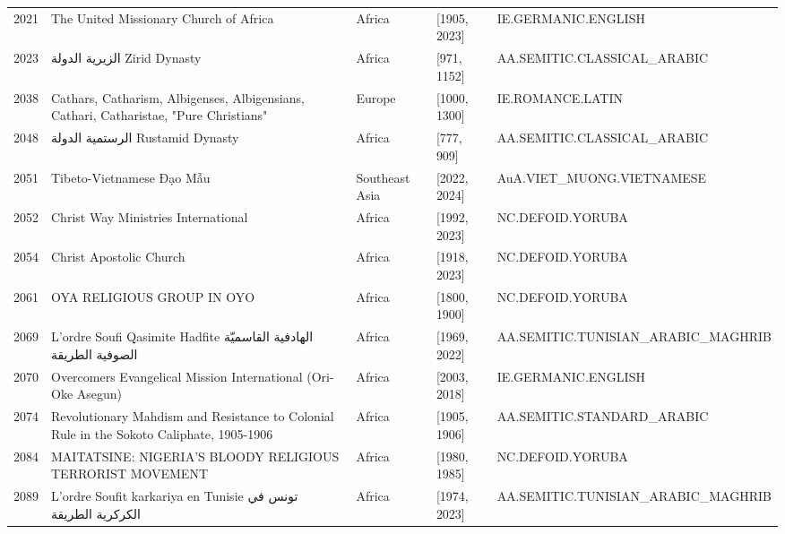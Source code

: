{\begin{longtable}{rp{3.5cm}llp{3.5cm}}
2021 & {\raggedright The United Missionary Church of Africa} & Africa & [1905, 2023] & {\raggedright IE.\allowbreak{}GERMANIC.\allowbreak{}ENGLISH} \\
2023 & {\raggedright {\arabicfont الزيرية الدولة} Zirid Dynasty} & Africa & [971, 1152] & {\raggedright AA.\allowbreak{}SEMITIC.\allowbreak{}CLASSICAL\_\allowbreak{}ARABIC} \\
2038 & {\raggedright Cathars, Catharism, Albigenses, Albigensians, Cathari, Catharistae, "Pure Christians"} & Europe & [1000, 1300] & {\raggedright IE.\allowbreak{}ROMANCE.\allowbreak{}LATIN} \\
2048 & {\raggedright {\arabicfont الرستمية الدولة} Rustamid Dynasty} & Africa & [777, 909] & {\raggedright AA.\allowbreak{}SEMITIC.\allowbreak{}CLASSICAL\_\allowbreak{}ARABIC} \\
2051 & {\raggedright Tibeto-Vietnamese Đạo Mẫu} & Southeast Asia & [2022, 2024] & {\raggedright AuA.\allowbreak{}VIET\_\allowbreak{}MUONG.\allowbreak{}VIETNAMESE} \\
2052 & {\raggedright Christ Way Ministries International} & Africa & [1992, 2023] & {\raggedright NC.\allowbreak{}DEFOID.\allowbreak{}YORUBA} \\
2054 & {\raggedright Christ Apostolic Church} & Africa & [1918, 2023] & {\raggedright NC.\allowbreak{}DEFOID.\allowbreak{}YORUBA} \\
2061 & {\raggedright OYA RELIGIOUS GROUP IN OYO} & Africa & [1800, 1900] & {\raggedright NC.\allowbreak{}DEFOID.\allowbreak{}YORUBA} \\
2069 & {\raggedright L'ordre Soufi Qasimite Hadfite {\arabicfont الهادفية القاسميّة الصوفية الطريقة}} & Africa & [1969, 2022] & {\raggedright AA.\allowbreak{}SEMITIC.\allowbreak{}TUNISIAN\_\allowbreak{}ARABIC\_\allowbreak{}MAGHRIB} \\
2070 & {\raggedright Overcomers Evangelical Mission International (Ori-Oke Asegun)} & Africa & [2003, 2018] & {\raggedright IE.\allowbreak{}GERMANIC.\allowbreak{}ENGLISH} \\
2074 & {\raggedright Revolutionary Mahdism and Resistance to Colonial Rule in the Sokoto Caliphate, 1905-1906} & Africa & [1905, 1906] & {\raggedright AA.\allowbreak{}SEMITIC.\allowbreak{}STANDARD\_\allowbreak{}ARABIC} \\
2084 & {\raggedright MAITATSINE: NIGERIA'S BLOODY RELIGIOUS TERRORIST MOVEMENT} & Africa & [1980, 1985] & {\raggedright NC.\allowbreak{}DEFOID.\allowbreak{}YORUBA} \\
2089 & {\raggedright L'ordre Soufit karkariya en Tunisie {\arabicfont تونس في الكركرية الطريقة}} & Africa & [1974, 2023] & {\raggedright AA.\allowbreak{}SEMITIC.\allowbreak{}TUNISIAN\_\allowbreak{}ARABIC\_\allowbreak{}MAGHRIB} \\

\end{longtable}}

